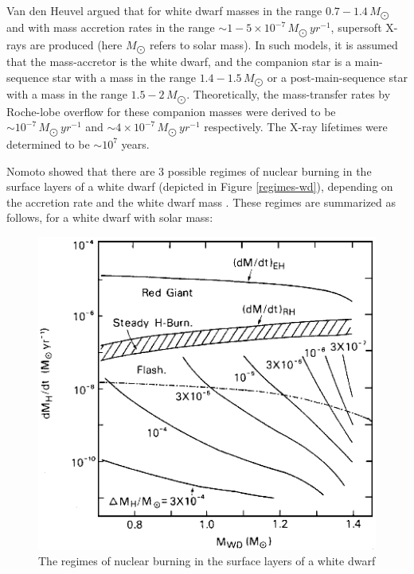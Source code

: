         	Van den Heuvel argued that for white dwarf masses in the range $0.7-1.4\,M_{\bigodot}$ and with mass accretion rates in the range $\sim 1-5\times 10^{-7}\,M_{\bigodot}\,yr^{-1}$, supersoft X-rays are produced \cite{vandenHeuvel92} (here $M_{\bigodot}$ refers to solar mass). In such models, it is assumed that the mass-accretor is the white dwarf, and the companion star is a main-sequence star with a mass in the range $1.4-1.5\,M_{\bigodot}$ or a post-main-sequence star with a mass in the range $1.5-2\,M_{\bigodot}$. Theoretically, the mass-transfer rates by Roche-lobe overflow for these companion masses were derived to be $\sim 10^{-7}\,M_{\bigodot}\,yr^{-1}$ and $\sim 4 \times 10^{-7}\,M_{\bigodot}\,yr^{-1}$ respectively. The X-ray lifetimes were determined to be $\sim 10^{7}$ years.
        	
        	Nomoto showed that there are 3 possible regimes of nuclear burning in the surface layers of a white dwarf (depicted in Figure \ref{regimes-wd}), depending on the accretion rate and the white dwarf mass \cite{nomoto82}. These regimes are summarized as follows, for a white dwarf with solar mass:
        	
        	\begin{figure}[h!]
        		\begin{center}
        			\includegraphics[scale=1.2]{ssxs-regimes.eps}
        			\caption{The regimes of nuclear burning in the surface layers of a white dwarf \cite{nomoto82}}
        			\label{fig:regimes-wd}
        		\end{center}
        	\end{figure}
        	
